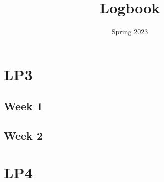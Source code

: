 \documentclass{article}
\title{Logbook}
\date{Spring 2023}
\newcommand{\logentry}[2]{
    \subsection{Week #2}
    
    \newpage
}
\begin{document}
\maketitle
\newpage
\tableofcontents
\newpage


\section{LP3}
    \logentry{3}{1}
    \logentry{3}{2}

\section{LP4}
\end{document}
